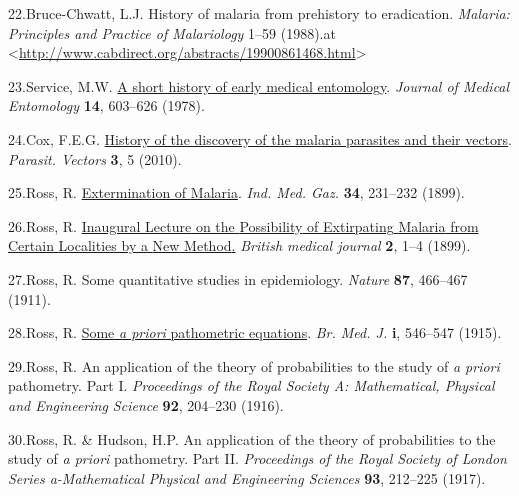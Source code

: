 \documentclass[
]{book}
\newlength{\cslhangindent}
\newlength{\cslentryspacingunit} %
\newenvironment{CSLReferences}[2] %
 {%
  \setlength{\parindent}{0pt}
  \ifodd #1
  \let\oldpar\par
  \def\par{\hangindent=\cslhangindent\oldpar}
  \fi
  \setlength{\parskip}{#2\cslentryspacingunit}
 }%
 {}
\begin{document}
\begin{CSLReferences}{0}{0}
\leavevmode{}%
22.Bruce-Chwatt, L.J. History of malaria from prehistory to eradication. \emph{Malaria: {Principles} and {Practice} of {Malariology}} 1--59 (1988).at \textless{}\url{http://www.cabdirect.org/abstracts/19900861468.html}\textgreater{}

\leavevmode{}%
23.Service, M.W. \href{http://eutils.ncbi.nlm.nih.gov/entrez/eutils/elink.fcgi?dbfrom=pubmed\&id=357723\&retmode=ref\&cmd=prlinks}{A short history of early medical entomology}. \emph{Journal of Medical Entomology} \textbf{14}, 603--626 (1978).

\leavevmode{}%
24.Cox, F.E.G. \href{https://doi.org/10.1186/1756-3305-3-5}{History of the discovery of the malaria parasites and their vectors}. \emph{Parasit. Vectors} \textbf{3}, 5 (2010).

\leavevmode{}%
25.Ross, R. \href{https://www.ncbi.nlm.nih.gov/pubmed/29002255}{Extermination of {Malaria}}. \emph{Ind. Med. Gaz.} \textbf{34}, 231--232 (1899).

\leavevmode{}%
26.Ross, R. \href{http://eutils.ncbi.nlm.nih.gov/entrez/eutils/elink.fcgi?dbfrom=pubmed\&id=20758555\&retmode=ref\&cmd=prlinks}{Inaugural {Lecture} on the {Possibility} of {Extirpating} {Malaria} from {Certain} {Localities} by a {New} {Method}.} \emph{British medical journal} \textbf{2}, 1--4 (1899).

\leavevmode{}%
27.Ross, R. Some quantitative studies in epidemiology. \emph{Nature} \textbf{87}, 466--467 (1911).

\leavevmode{}%
28.Ross, R. \href{https://doi.org/10.1136/bmj.1.2830.546}{Some \emph{a priori} pathometric equations}. \emph{Br. Med. J.} \textbf{i}, 546--547 (1915).

\leavevmode{}%
29.Ross, R. An application of the theory of probabilities to the study of \emph{a priori} pathometry. {Part} {I}. \emph{Proceedings of the Royal Society A: Mathematical, Physical and Engineering Science} \textbf{92}, 204--230 (1916).

\leavevmode{}%
30.Ross, R. \& Hudson, H.P. An application of the theory of probabilities to the study of \emph{a priori} pathometry. {Part} {II}. \emph{Proceedings of the Royal Society of London Series a-Mathematical Physical and Engineering Sciences} \textbf{93}, 212--225 (1917).


\end{CSLReferences}
\end{document}
